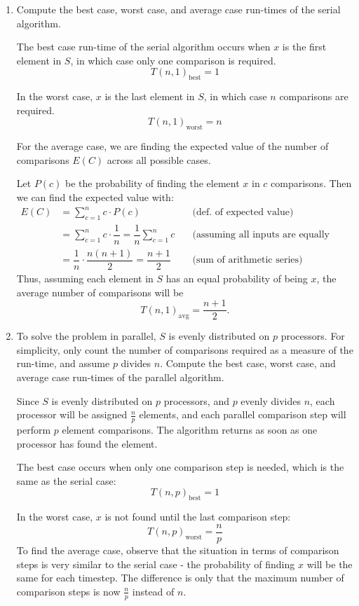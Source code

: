 \documentclass[twoside,10pt]{article}
\newcommand{\eqn}[1]{\begin{equation*}#1\end{equation*}}
\newcommand{\aln}[1]{\begin{align*}#1\end{align*}}
\begin{document}
\begin{enumerate}[label=(\alph*)]
\item Compute the best case, worst case, and average case run-times of the serial algorithm.

\quad The best case run-time of the serial algorithm occurs when $x$ is the first element in $S$, in which case only one comparison is required.
\eqn{T(n,1)_\text{best} = 1}

\quad In the worst case, $x$ is the last element in $S$, in which case $n$ comparisons are required.
\eqn{T(n,1)_\text{worst} = n}

\quad For the average case, we are finding the expected value of the number of comparisons $E(C)$ across all possible cases.

\quad Let $P(c)$ be the probability of finding the element $x$ in $c$ comparisons.
Then we can find the expected value with:
\aln{
  E(C) &= \sum_{c = 1}^{n}{c \cdot P(c)} \quad&\text{(def. of expected value)}\\
  &= \sum_{c = 1}^{n}{c\cdot\dfrac{1}{n}} = \dfrac{1}{n}\sum_{c = 1}^{n}{c} \quad&\text{(assuming all inputs are equally likely)}\\
  &= \dfrac{1}{n}\cdot\dfrac{n(n+1)}{2} = \dfrac{n+1}{2} \quad&\text{(sum of arithmetic series)}
}
\quad Thus, assuming each element in $S$ has an equal probability of being $x$, the average number of comparisons will be
\eqn{T(n,1)_\text{avg} = \frac{n+1}{2}.}

\item To solve the problem in parallel, $S$ is evenly distributed on $p$ processors.
For simplicity, only count the number of comparisons required as a measure of the run-time, and assume $p$ divides $n$.
Compute the best case, worst case, and average case run-times of the parallel algorithm.

\quad Since $S$ is evenly distributed on $p$ processors, and $p$ evenly divides $n$, each processor will be assigned $\frac{n}{p}$ elements, and each parallel comparison step will perform $p$ element comparisons.
The algorithm returns as soon as one processor has found the element.

\quad The best case occurs when only one comparison step is needed, which is the same as the serial case:
\eqn{T(n,p)_\text{best} = 1}

\quad In the worst case, $x$ is not found until the last comparison step:
\eqn{T(n,p)_\text{worst} = \frac{n}{p}}
\quad To find the average case, observe that the situation in terms of comparison steps is very similar to the serial case - the probability of finding $x$ will be the same for each timestep.
The difference is only that the maximum number of comparison steps is now $\frac{n}{p}$ instead of $n$.


\end{enumerate}
\end{document}
